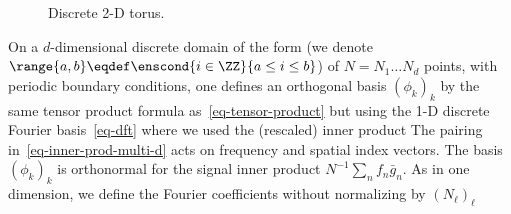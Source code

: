 \begin{figure}[tbp]
\centering
{}
\caption{Discrete 2-D torus.}
\label{fig-review-fourier-torus-discrete}
\end{figure}
On a $d$-dimensional discrete domain of the form
(we denote $\range{a,b} \eqdef \enscond{i \in \ZZ}{a \leq i \leq b}$)
of $N=N_1\ldots N_d$ points, with periodic boundary conditions, one defines an orthogonal basis $(\phi_k)_k$ by the same tensor product formula as~\eqref{eq-tensor-product} but using the 1-D discrete Fourier basis~\eqref{eq-dft}
where we used the (rescaled) inner product
The pairing in~\eqref{eq-inner-prod-multi-d} acts on frequency and spatial index vectors. The basis $(\phi_k)_k$ is orthonormal for the signal inner product $N^{-1}\sum_n f_n\bar g_n$. As in one dimension, we define the Fourier coefficients without normalizing by $(N_\ell)_\ell$